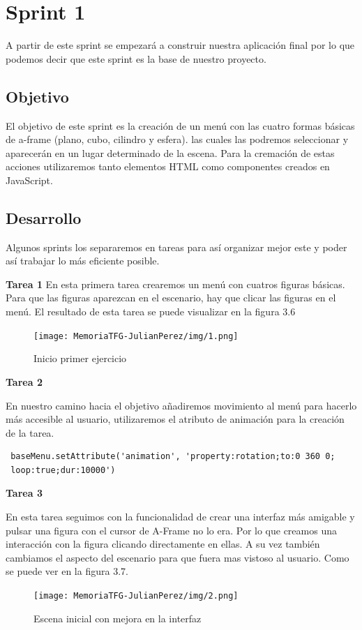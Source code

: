\documentclass[a4paper, 12pt]{book}
\begin{document}
\section{Sprint 1}
A partir de este sprint se empezará a construir nuestra aplicación final por lo que podemos decir que este sprint es la base de nuestro proyecto. 
\subsection{Objetivo}
El objetivo de este sprint es la creación de un menú con las cuatro formas básicas de a-frame (plano, cubo, cilindro y esfera). las cuales las podremos seleccionar y aparecerán en un lugar determinado de la escena. Para la cremación de estas acciones utilizaremos tanto elementos HTML como componentes creados en JavaScript.

\subsection{Desarrollo}
Algunos sprints los separaremos en tareas para así organizar mejor este y poder así trabajar lo más eficiente posible.

\textbf{Tarea 1}
En esta primera tarea crearemos un menú con cuatros figuras básicas.
Para que las figuras aparezcan en el escenario, hay que clicar las figuras en el menú.
El resultado de esta tarea se puede visualizar en la figura 3.6
\begin{figure}[H]
  \centering
  \texttt{[image: MemoriaTFG-JulianPerez/img/1.png]}
  \caption{Inicio primer ejercicio}\label{scrum}
\end{figure}

\textbf{Tarea 2}

En nuestro camino hacia el objetivo añadiremos movimiento al menú para hacerlo más accesible al usuario, utilizaremos el atributo  de animación para la creación de la tarea.
\begin{verbatim}
 baseMenu.setAttribute('animation', 'property:rotation;to:0 360 0;
 loop:true;dur:10000')   
\end{verbatim}

\textbf{Tarea 3}

En esta tarea seguimos con la funcionalidad de crear una interfaz más amigable y pulsar una figura con el cursor de A-Frame no lo era. Por lo que creamos una interacción con la figura clicando directamente en ellas. A su vez también cambiamos el aspecto del escenario para que fuera mas vistoso al usuario. Como se puede ver en la figura 3.7.
         \begin{figure}[H]
  \centering
  \texttt{[image: MemoriaTFG-JulianPerez/img/2.png]}
  \caption{Escena inicial con mejora en la interfaz}\label{scrum}
\end{figure}
\end{document}
